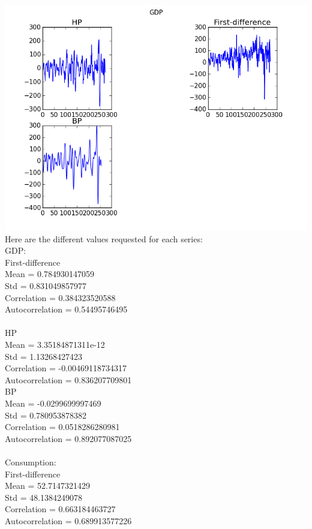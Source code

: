 \documentclass[letterpaper,12pt]{article}
\theoremstyle{definition}
\begin{document}
\includegraphics[scale = .75]{elevensixconsumption}
Here are the different values requested for each series:\\

GDP:\\

First-difference\\
Mean = 0.784930147059\\
Std = 0.831049857977\\
Correlation = 0.384323520588\\
Autocorrelation = 0.54495746495\\
\\
HP\\
Mean = 3.35184871311e-12\\
Std = 1.13268427423\\
Correlation = -0.00469118734317\\
Autocorrelation = 0.836207709801\\

BP\\
Mean = -0.0299699997469\\
Std = 0.780953878382\\
Correlation = 0.0518286280981\\
Autocorrelation = 0.892077087025\\
\\
Consumption:\\

First-difference\\
Mean = 52.7147321429\\
Std = 48.1384249078\\
Correlation = 0.663184463727\\
Autocorrelation = 0.689913577226\\
\end{document}
